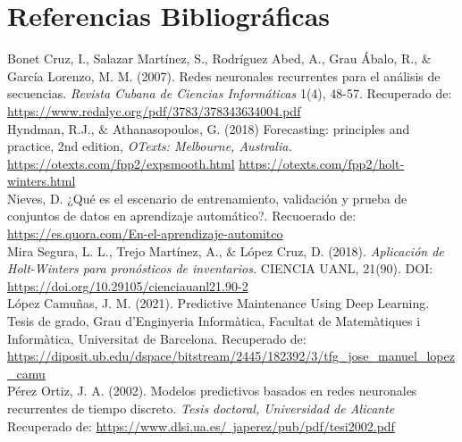 \documentclass[10pt]{article}
\begin{document}
\newpage
\section{Referencias Bibliográficas}

Bonet Cruz, I., Salazar Martínez, S., Rodríguez Abed, A., Grau Ábalo, R., $\&$ García Lorenzo, M. M. (2007). Redes neuronales recurrentes para el análisis de secuencias. \textit{Revista Cubana de Ciencias Informáticas} 1(4), 48-57. Recuperado de: \href{https://www.redalyc.org/pdf/3783/378343634004.pdf}{https://www.redalyc.org/pdf/3783/378343634004.pdf} \\

Hyndman, R.J., $\&$ Athanasopoulos, G. (2018) Forecasting: principles and practice, 2nd edition, \textit{OTexts: Melbourne, Australia.} \href{https://otexts.com/fpp2/expsmooth.html}{https://otexts.com/fpp2/expsmooth.html} \href{https://otexts.com/fpp2/holt-winters.html}{https://otexts.com/fpp2/holt-winters.html}\\

Nieves, D. ¿Qué es el escenario de entrenamiento, validación y prueba de conjuntos de datos en aprendizaje automático?. Recuoerado de: \href{https://es.quora.com/En-el-aprendizaje-autom%C3%A1tico-cu%C3%A1l-es-el-prop%C3%B3sito-de-dividir-los-datos-en-conjuntos-de-prueba-y-conjuntos-de-entrenamiento}{https://es.quora.com/En-el-aprendizaje-automitco}\\

Mira Segura, L. L., Trejo Martínez, A., $\&$ López Cruz, D. (2018). \textit{Aplicación de Holt-Winters para pronósticos de inventarios.} CIENCIA UANL, 21(90). DOI: \href{https://doi.org/10.29105/cienciauanl21.90-2}{https://doi.org/10.29105/cienciauanl21.90-2} \\

López Camuñas, J. M. (2021). Predictive Maintenance Using Deep Learning. Tesis de grado, Grau d'Enginyeria Informàtica, Facultat de Matemàtiques i Informàtica, Universitat de Barcelona. Recuperado de: \href{https://diposit.ub.edu/dspace/bitstream/2445/182392/3/tfg_jose_manuel_lopez_camu%C3%B1as.pdf}{https://diposit.ub.edu/dspace/bitstream/2445/182392/3/tfg_jose_manuel_lopez_camu} \\

Pérez Ortiz, J. A. (2002). Modelos predictivos basados en redes neuronales recurrentes de tiempo discreto. \textit{Tesis doctoral, Universidad de Alicante} Recuperado de: 
\href{https://www.dlsi.ua.es/~japerez/pub/pdf/tesi2002.pdf}{https://www.dlsi.ua.es/~japerez/pub/pdf/tesi2002.pdf} \\
\end{document}
